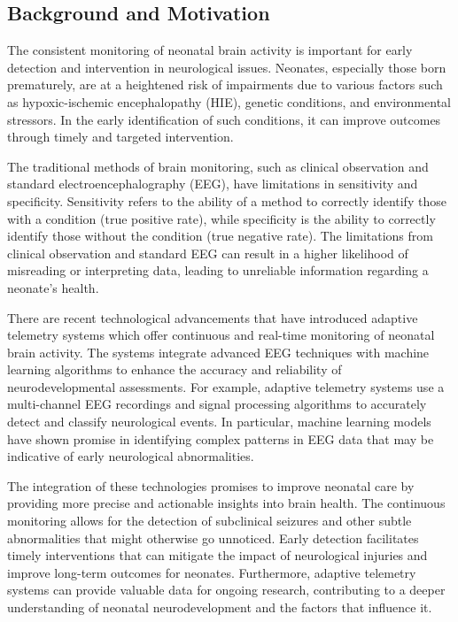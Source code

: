\documentclass[12pt,journal,compsoc]{IEEEtran}
\begin{document}
\subsection{Background and Motivation}
The consistent monitoring of neonatal brain activity is important for early detection and intervention in neurological issues. Neonates, especially those born prematurely, are at a heightened risk of impairments due to various factors such as hypoxic-ischemic encephalopathy (HIE), genetic conditions, and environmental stressors. In the early identification of such conditions, it can improve outcomes through timely and targeted intervention.

The traditional methods of brain monitoring, such as clinical observation and standard electroencephalography (EEG), have limitations in sensitivity and specificity. Sensitivity refers to the ability of a method to correctly identify those with a condition (true positive rate), while specificity is the ability to correctly identify those without the condition (true negative rate). The limitations from clinical observation and standard EEG can result in a higher likelihood of misreading or interpreting data, leading to unreliable information regarding a neonate's health. 

There are recent technological advancements that have introduced adaptive telemetry systems which offer continuous and real-time monitoring of neonatal brain activity. The systems integrate advanced EEG techniques with machine learning algorithms to enhance the accuracy and reliability of neurodevelopmental assessments. For example, adaptive telemetry systems use a multi-channel EEG recordings and signal processing algorithms to accurately detect and classify neurological events. In particular, machine learning models have shown promise in identifying complex patterns in EEG data that may be indicative of early neurological abnormalities.

The integration of these technologies promises to improve neonatal care by providing more precise and actionable insights into brain health. The continuous monitoring allows for the detection of subclinical seizures and other subtle abnormalities that might otherwise go unnoticed. Early detection facilitates timely interventions that can mitigate the impact of neurological injuries and improve long-term outcomes for neonates. Furthermore, adaptive telemetry systems can provide valuable data for ongoing research, contributing to a deeper understanding of neonatal neurodevelopment and the factors that influence it.
\end{document}
